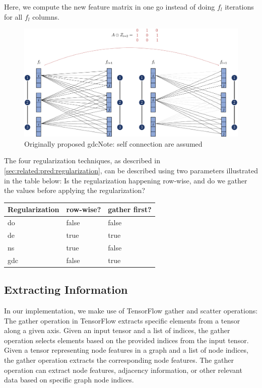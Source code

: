 Here, we compute the new feature matrix in one go instead of doing $f_{l}$ iterations for all $f_{l}$ columns.
\begin{figure}[ht]
    \centering
    \includegraphics[width= 0.90\linewidth]{gfx/implementation/GDC-eq5.pdf}
    \caption{Originally proposed \ac{gdc}Note: self connection are assumed}\label{fig:implementaion:GDC-eq5}
\end{figure}




The four regularization techniques, as described in \ref{sec:related:pred:regularization}, can be described using two parameters illustrated in the table below: Is the regularization happening row-wise, and do we gather the values before applying the regularization?
\begin{center}
    \begin{tabular}{lll}
        \toprule
        \textbf{Regularization} & \textbf{row-wise?} & \textbf{gather first?} \\
        \midrule
        \acf{do}                & false              & false                  \\
        \acf{de}                & true               & true                   \\
        \acf{ns}                & true               & false                  \\
        \acf{gdc}               & false              & true                   \\

        \bottomrule
    \end{tabular}
\end{center}
\subsection{Extracting Information}
In our implementation, we make use of TensorFlow gather and scatter operations:
The gather operation in TensorFlow extracts specific elements from a tensor along a given axis. Given an input tensor and a list of indices, the gather operation selects elements based on the provided indices from the input tensor. Given a tensor representing node features in a graph and a list of node indices, the gather operation extracts the corresponding node features. The gather operation can extract node features, adjacency information, or other relevant data based on specific graph node indices.

